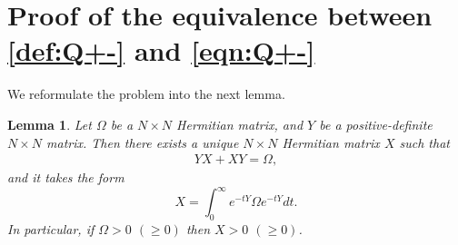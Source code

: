 \documentclass{article}
\numberwithin{equation}{section}
\newtheorem{lemma}[theorem]{Lemma}
\begin{document}
\section{Proof of the equivalence between \eqref{def:Q+-} and \eqref{eqn:Q+-}}\label{sec:LMDdelta}
We reformulate the problem into the next lemma.
\begin{lemma} 
Let $\Omega$ be a $N\times N$ Hermitian matrix, and $Y$ be a positive-definite $N\times N$ matrix. Then there exists a unique $N\times N$ Hermitian matrix $X$ such that
\begin{align}\label{eqn:DXOmega}
YX + XY = \Omega, 
\end{align} and it takes the form
\begin{equation}\label{eq:DXomega}
X = \int_{0}^{\infty} e^{-tY} \Omega e^{-tY} dt.
\end{equation}
In particular, if $\Omega > 0$ $(\geq 0)$ then $X > 0$ $(\geq 0)$.
\end{lemma}
\end{document}
